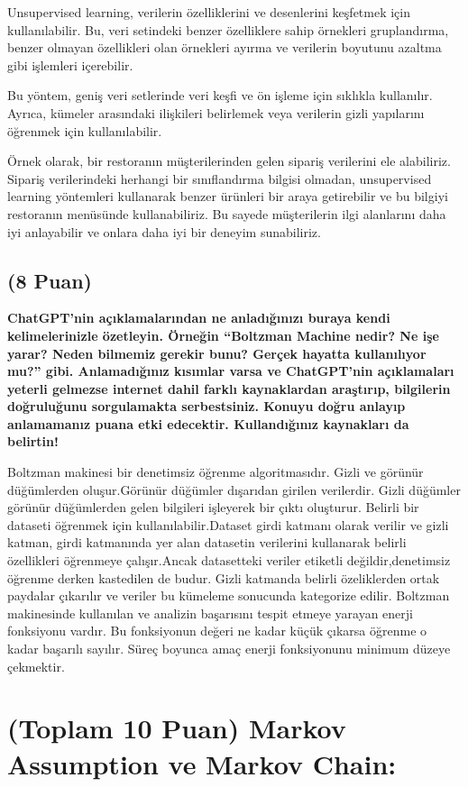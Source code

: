 \documentclass[11pt]{article}
\begin{document}
Unsupervised learning, verilerin özelliklerini ve desenlerini keşfetmek için kullanılabilir. Bu, veri setindeki benzer özelliklere sahip örnekleri gruplandırma, benzer olmayan özellikleri olan örnekleri ayırma ve verilerin boyutunu azaltma gibi işlemleri içerebilir.

Bu yöntem, geniş veri setlerinde veri keşfi ve ön işleme için sıklıkla kullanılır. Ayrıca, kümeler arasındaki ilişkileri belirlemek veya verilerin gizli yapılarını öğrenmek için kullanılabilir.

Örnek olarak, bir restoranın müşterilerinden gelen sipariş verilerini ele alabiliriz. Sipariş verilerindeki herhangi bir sınıflandırma bilgisi olmadan, unsupervised learning yöntemleri kullanarak benzer ürünleri bir araya getirebilir ve bu bilgiyi restoranın menüsünde kullanabiliriz. Bu sayede müşterilerin ilgi alanlarını daha iyi anlayabilir ve onlara daha iyi bir deneyim sunabiliriz.

\subsection{(8 Puan)} \textbf{ChatGPT’nin açıklamalarından ne anladığınızı buraya kendi kelimelerinizle özetleyin. Örneğin ``Boltzman Machine nedir? Ne işe yarar? Neden bilmemiz gerekir bunu? Gerçek hayatta kullanılıyor mu?'' gibi. Anlamadığınız kısımlar varsa ve ChatGPT’nin açıklamaları yeterli gelmezse internet dahil farklı kaynaklardan araştırıp, bilgilerin doğruluğunu sorgulamakta serbestsiniz. Konuyu doğru anlayıp anlamamanız puana etki edecektir. Kullandığınız kaynakları da belirtin!}

Boltzman makinesi bir denetimsiz öğrenme algoritmasıdır. Gizli ve görünür düğümlerden oluşur.Görünür düğümler dışarıdan girilen verilerdir. Gizli düğümler görünür düğümlerden gelen bilgileri işleyerek bir çıktı oluşturur. Belirli bir dataseti öğrenmek için kullanılabilir.Dataset girdi katmanı olarak verilir ve gizli katman, girdi katmanında yer alan datasetin verilerini kullanarak belirli özellikleri öğrenmeye çalışır.Ancak datasetteki veriler etiketli değildir,denetimsiz öğrenme derken kastedilen de budur. Gizli katmanda belirli özeliklerden ortak paydalar çıkarılır ve veriler bu kümeleme sonucunda kategorize edilir. Boltzman makinesinde kullanılan ve analizin başarısını tespit etmeye yarayan enerji fonksiyonu vardır. Bu fonksiyonun değeri ne kadar küçük çıkarsa öğrenme o kadar başarılı sayılır. Süreç boyunca amaç enerji fonksiyonunu minimum düzeye çekmektir.

\section{(Toplam 10 Puan) Markov Assumption ve Markov Chain:}
\end{document}
